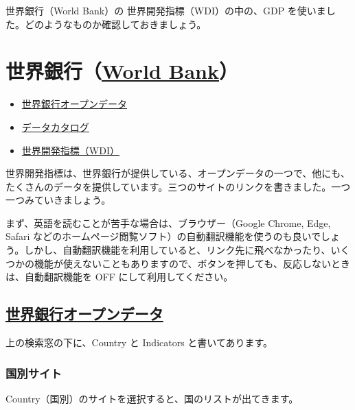 \documentclass[
  xelatex, ja=standard]{bxjsbook}
\providecommand{\tightlist}{%
  \setlength{\itemsep}{0pt}\setlength{\parskip}{0pt}}
\theoremstyle{definition}
\theoremstyle{definition}
\theoremstyle{definition}
\theoremstyle{definition}
\theoremstyle{remark}
\begin{document}
世界銀行（World Bank）の 世界開発指標（WDI）の中の、GDP を使いました。どのようなものか確認しておきましょう。

\hypertarget{ux4e16ux754cux9280ux884cworld-bank}{%
\section{\texorpdfstring{世界銀行（\href{https://www.worldbank.org/en/home}{World Bank}）}{世界銀行（World Bank）}}\label{ux4e16ux754cux9280ux884cworld-bank}}

\begin{itemize}
\tightlist
\item
  \href{https://data.worldbank.org}{世界銀行オープンデータ}
\item
  \href{https://datacatalog.worldbank.org/home}{データカタログ}
\item
  \href{https://datatopics.worldbank.org/world-development-indicators/}{世界開発指標（WDI）}
\end{itemize}

世界開発指標は、世界銀行が提供している、オープンデータの一つで、他にも、たくさんのデータを提供しています。三つのサイトのリンクを書きました。一つ一つみていきましょう。

まず、英語を読むことが苦手な場合は、ブラウザー（Google Chrome, Edge, Safari などのホームページ閲覧ソフト）の自動翻訳機能を使うのも良いでしょう。しかし、自動翻訳機能を利用していると、リンク先に飛べなかったり、いくつかの機能が使えないこともありますので、ボタンを押しても、反応しないときは、自動翻訳機能を OFF にして利用してください。

\hypertarget{ux4e16ux754cux9280ux884cux30aaux30fcux30d7ux30f3ux30c7ux30fcux30bf}{%
\subsection{\texorpdfstring{\href{https://data.worldbank.org}{世界銀行オープンデータ}}{世界銀行オープンデータ}}\label{ux4e16ux754cux9280ux884cux30aaux30fcux30d7ux30f3ux30c7ux30fcux30bf}}

上の検索窓の下に、Country と Indicators と書いてあります。

\hypertarget{ux56fdux5225ux30b5ux30a4ux30c8}{%
\subsubsection{国別サイト}\label{ux56fdux5225ux30b5ux30a4ux30c8}}

Country（国別）のサイトを選択すると、国のリストが出てきます。
\end{document}
